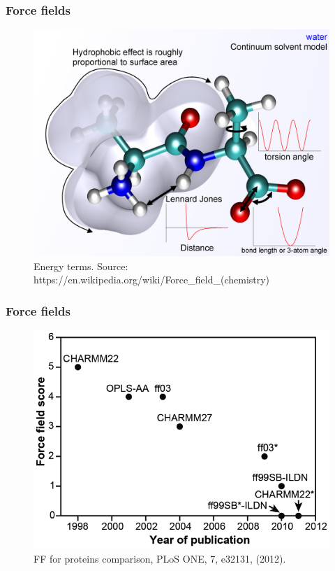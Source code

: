 \documentclass{beamer}
\begin{document}
\begin{frame}\frametitle{Force fields}

\begin{figure}
\includegraphics[scale=1.441]{1024px-MM_PEF.png}
\caption{{\scriptsize Energy terms. Source: https://en.wikipedia.org/wiki/Force\_field\_(chemistry)}}
\end{figure}


\end{frame}

\begin{frame}\frametitle{Force fields}

\begin{figure}
\includegraphics[scale=0.34]{ff_comparison.png}
\caption{{\scriptsize FF for proteins comparison, PLoS ONE, 7, e32131, (2012).}}
\end{figure}


\end{frame}
\end{document}
